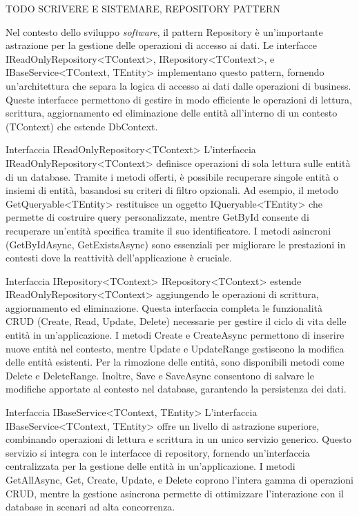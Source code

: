                         TODO SCRIVERE E SISTEMARE, REPOSITORY PATTERN 

Nel contesto dello sviluppo \textit{software}, il pattern Repository è un'importante astrazione per la gestione delle operazioni di accesso ai dati. Le interfacce IReadOnlyRepository<TContext>, IRepository<TContext>, e IBaseService<TContext, TEntity> implementano questo pattern, fornendo un'architettura che separa la logica di accesso ai dati dalle operazioni di business. Queste interfacce permettono di gestire in modo efficiente le operazioni di lettura, scrittura, aggiornamento ed eliminazione delle entità all'interno di un contesto (TContext) che estende DbContext.

Interfaccia IReadOnlyRepository<TContext>
L'interfaccia IReadOnlyRepository<TContext> definisce operazioni di sola lettura sulle entità di un database. Tramite i metodi offerti, è possibile recuperare singole entità o insiemi di entità, basandosi su criteri di filtro opzionali. Ad esempio, il metodo GetQueryable<TEntity> restituisce un oggetto IQueryable<TEntity> che permette di costruire query personalizzate, mentre GetById consente di recuperare un'entità specifica tramite il suo identificatore. I metodi asincroni (GetByIdAsync, GetExistsAsync) sono essenziali per migliorare le prestazioni in contesti dove la reattività dell'applicazione è cruciale.

Interfaccia IRepository<TContext>
IRepository<TContext> estende IReadOnlyRepository<TContext> aggiungendo le operazioni di scrittura, aggiornamento ed eliminazione. Questa interfaccia completa le funzionalità CRUD (Create, Read, Update, Delete) necessarie per gestire il ciclo di vita delle entità in un'applicazione. I metodi Create e CreateAsync permettono di inserire nuove entità nel contesto, mentre Update e UpdateRange gestiscono la modifica delle entità esistenti. Per la rimozione delle entità, sono disponibili metodi come Delete e DeleteRange. Inoltre, Save e SaveAsync consentono di salvare le modifiche apportate al contesto nel database, garantendo la persistenza dei dati.

Interfaccia IBaseService<TContext, TEntity>
L'interfaccia IBaseService<TContext, TEntity> offre un livello di astrazione superiore, combinando operazioni di lettura e scrittura in un unico servizio generico. Questo servizio si integra con le interfacce di repository, fornendo un'interfaccia centralizzata per la gestione delle entità in un'applicazione. I metodi GetAllAsync, Get, Create, Update, e Delete coprono l'intera gamma di operazioni CRUD, mentre la gestione asincrona permette di ottimizzare l'interazione con il database in scenari ad alta concorrenza.

